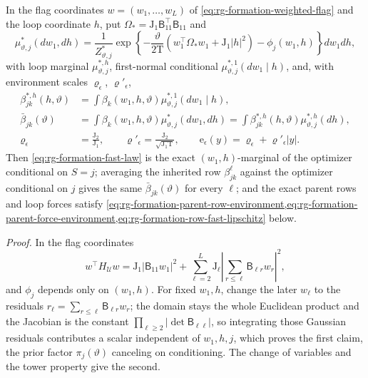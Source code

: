 In the flag coordinates \(w=(w_1,\ldots,w_L)\) of
\cref{eq:rg-formation-weighted-flag} and the loop coordinate \(h\), put
\(\Omega_*=\mathrm J_1\mathsf B_{11}^\top\mathsf B_{11}\) and
\begin{equation}
 \mu_{\vartheta,j}^*(dw_1,dh)
 =\frac{1}{Z_{\vartheta,j}^*}
   \exp\left\{-\frac{\vartheta}{2\mathrm T}
         (w_1^\top\Omega_*w_1+\mathrm J_1|h|^2)-\phi_j(w_1,h)\right\}dw_1 dh,
 \label{eq:rg-formation-fast-law}
\end{equation}
with loop marginal \(\mu_{\vartheta,j}^{*,h}\), first-normal conditional
\(\mu_{\vartheta,j}^{*,1}(dw_1\mid h)\), and, with environment scales
\(\varrho_\epsilon\), \(\varrho'_\epsilon\),
\begin{align}
 \beta_{jk}^{*,h}(h,\vartheta)
 &=\int\beta_k(w_1,h,\vartheta)
                   \mu_{\vartheta,j}^{*,1}(dw_1\mid h),
 \label{eq:rg-formation-fast-loop-row}\\
 \bar\beta_{jk}(\vartheta)
 &=\int\beta_k(w_1,h,\vartheta) \mu_{\vartheta,j}^*(dw_1,dh)
   =\int\beta_{jk}^{*,h}(h,\vartheta)
                    \mu_{\vartheta,j}^{*,h}(dh),
 \label{eq:rg-formation-common-averaged-row}\\
 \varrho_\epsilon&=\frac{\mathrm J_2}{\mathrm J_1},\qquad
 \varrho'_\epsilon=\frac{\mathrm J_2}{\sqrt{\mathrm J_1\mathrm T}},\qquad
 \mathrm e_\epsilon(y)=\varrho_\epsilon+\varrho'_\epsilon|y|.
 \label{eq:rg-formation-environment-scales}
\end{align}
Then \cref{eq:rg-formation-fast-law} is the exact \((w_1,h)\)-marginal of the
optimizer conditional on \(S=j\); averaging the inherited row
\(\beta^\ell_{jk}\) against the optimizer conditional on \(j\) gives the same
\(\bar\beta_{jk}(\vartheta)\) for every \(\ell\); and the exact parent rows and
loop forces satisfy
\cref{eq:rg-formation-parent-row-environment,eq:rg-formation-parent-force-environment,eq:rg-formation-row-fast-lipschitz}
below. 

\noindent\emph{Proof.}
In the flag coordinates
\begin{equation}
 w^\top H_{\mathcal U}w
 =\mathrm J_1|\mathsf B_{11}w_1|^2
       +\sum_{\ell=2}^L\mathrm J_\ell
             \left|\sum_{r\le\ell}\mathsf B_{\ell r}w_r\right|^2,
 \label{eq:rg-formation-triangular-fast-quadratic}
\end{equation}
and \(\phi_j\) depends only on \((w_1,h)\). For fixed \(w_1,h\), change the
later \(w_\ell\) to the residuals \(r_\ell=\sum_{r\le\ell}\mathsf B_{\ell r}w_r\);
the domain stays the whole Euclidean product and the Jacobian is the constant
\(\prod_{\ell\ge2}|\det\mathsf B_{\ell\ell}|\), so integrating those Gaussian
residuals contributes a scalar independent of \(w_1,h,j\), which proves the
first claim, the prior factor \(\pi_j(\vartheta)\) canceling on conditioning.
The change of variables and the tower property give the second.

